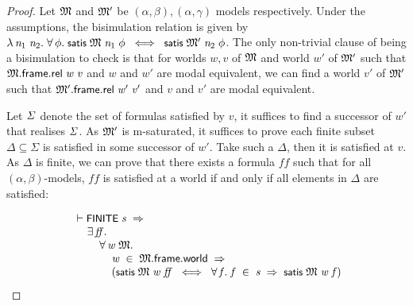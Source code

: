 \documentclass[letterpaper]{article}
\renewcommand{\HOLConst}[1]{{\textsf{\upshape\small #1}}}
\renewcommand{\HOLinline}[1]{\ensuremath{#1}}
\newenvironment{holmath}{\begin{displaymath}\begin{array}{l}}{\end{array}\end{displaymath}\ignorespacesafterend}
\begin{document}
\begin{proof}
Let \HOLinline{\HOLFreeVar{\ensuremath{\mathfrak{M}}}} and \HOLinline{\HOLFreeVar{\ensuremath{\mathfrak{M}'}}} be $(\alpha,\beta),(\alpha,\gamma)$ models respectively. Under the assumptions, the bisimulation relation is given by \HOLinline{\HOLTokenLambda{}\HOLBoundVar{n\sb{\mathrm{1}}}\;\HOLBoundVar{n\sb{\mathrm{2}}}.\;\HOLSymConst{\HOLTokenForall{}}\HOLBoundVar{\ensuremath{\phi}}.\;\HOLConst{satis}\;\HOLFreeVar{\ensuremath{\mathfrak{M}}}\;\HOLBoundVar{n\sb{\mathrm{1}}}\;\HOLBoundVar{\ensuremath{\phi}}\;\HOLSymConst{\HOLTokenEquiv{}}\;\HOLConst{satis}\;\HOLFreeVar{\ensuremath{\mathfrak{M}'}}\;\HOLBoundVar{n\sb{\mathrm{2}}}\;\HOLBoundVar{\ensuremath{\phi}}}. The only non-trivial clause of being a bisimulation to check is that for worlds $w,v$ of \HOLinline{\HOLFreeVar{\ensuremath{\mathfrak{M}}}} and world $w'$ of \HOLinline{\HOLFreeVar{\ensuremath{\mathfrak{M}'}}} such that \HOLinline{\HOLFreeVar{\ensuremath{\mathfrak{M}}}.\HOLFieldName{frame}.\HOLFieldName{rel}\;\HOLFreeVar{w}\;\HOLFreeVar{v}} and $w$ and $w'$ are modal equivalent, we can find a world $v'$ of \HOLinline{\HOLFreeVar{\ensuremath{\mathfrak{M}'}}} such that \HOLinline{\HOLFreeVar{\ensuremath{\mathfrak{M}'}}.\HOLFieldName{frame}.\HOLFieldName{rel}\;\HOLFreeVar{w\sp{\prime}}\;\HOLFreeVar{v\sp{\prime}}} and $v$ and $v'$ are modal equivalent. 

Let \HOLinline{\HOLFreeVar{\ensuremath{\Sigma}}} denote the set of formulas satisfied by $v$, it suffices to find a successor of $w'$ that realises \HOLinline{\HOLFreeVar{\ensuremath{\Sigma}}}. As \HOLinline{\HOLFreeVar{\ensuremath{\mathfrak{M}'}}} is m-saturated, it suffices to prove each finite subset $\Delta\subseteq \Sigma$ is satisfied in some successor of $w'$. Take such a $\Delta$, then it is satisfied at $v$. As $\Delta$ is finite, we can prove that there exists a formula $ff$ such that for all $(\alpha,\beta)$-models, $ff$ is satisfied at a world if and only if all elements in $\Delta$ are satisfied:

\begin{holmath}
  \ensuremath{\HOLTokenTurnstile}\HOLConst{FINITE}\;\HOLFreeVar{s}\;\HOLSymConst{\HOLTokenImp{}}\\
\;\;\;\;\;\HOLSymConst{\HOLTokenExists{}}\HOLBoundVar{ff}.\\
\;\;\;\;\;\;\;\;\;\HOLSymConst{\HOLTokenForall{}}\HOLBoundVar{w}\;\HOLBoundVar{\ensuremath{\mathfrak{M}}}.\\
\;\;\;\;\;\;\;\;\;\;\;\;\;\HOLBoundVar{w}\;\HOLSymConst{\HOLTokenIn{}}\;\HOLBoundVar{\ensuremath{\mathfrak{M}}}.\HOLFieldName{frame}.\HOLFieldName{world}\;\HOLSymConst{\HOLTokenImp{}}\\
\;\;\;\;\;\;\;\;\;\;\;\;\;(\HOLConst{satis}\;\HOLBoundVar{\ensuremath{\mathfrak{M}}}\;\HOLBoundVar{w}\;\HOLBoundVar{ff}\;\HOLSymConst{\HOLTokenEquiv{}}\;\HOLSymConst{\HOLTokenForall{}}\HOLBoundVar{f}.\;\HOLBoundVar{f}\;\HOLSymConst{\HOLTokenIn{}}\;\HOLFreeVar{s}\;\HOLSymConst{\HOLTokenImp{}}\;\HOLConst{satis}\;\HOLBoundVar{\ensuremath{\mathfrak{M}}}\;\HOLBoundVar{w}\;\HOLBoundVar{f})
\end{holmath}


\end{proof}
\end{document}
